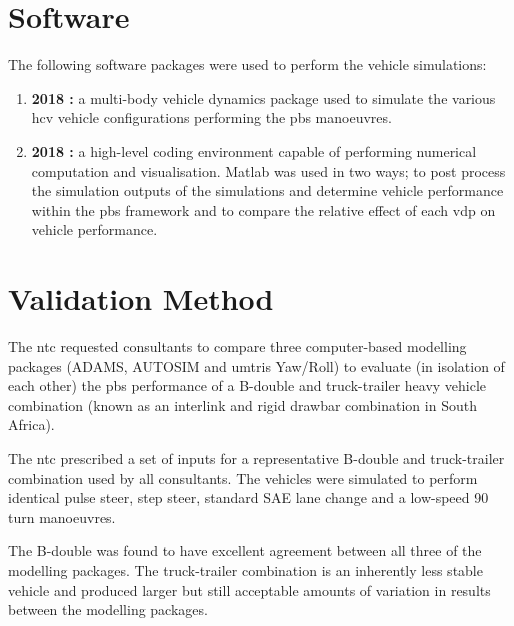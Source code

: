 \section{Software}\label{section:software}

The following software packages were used to perform the vehicle simulations:

\begin{enumerate}
	\item \textbf{\trucksim{} 2018 \cite{MechanicalSimulation2016}:} a multi-body vehicle dynamics package used to simulate the various \gls{hcv} vehicle configurations performing the \gls{pbs} manoeuvres.
	\item \textbf{\matlab{} 2018 \cite{MATHWORKS2015}:} a high-level coding environment capable of performing numerical computation and visualisation. Matlab was used in two ways; to post process the simulation outputs of the \trucksim{} simulations and determine vehicle performance within the \gls{pbs} framework and to compare the relative effect of each \gls{vdp} on vehicle performance.
\end{enumerate}

\section{Validation Method}\label{section:validation-method}

The \gls{ntc} requested consultants to compare three computer-based modelling packages (ADAMS, AUTOSIM and \glspl{umtri} Yaw/Roll) to evaluate (in isolation of each other) the \gls{pbs} performance of a B-double and truck-trailer heavy vehicle combination \cite{Prem2001} (known as an interlink and rigid drawbar combination in South Africa).

The \gls{ntc} prescribed a set of inputs for a representative B-double and truck-trailer combination used by all consultants. The vehicles were simulated to perform identical pulse steer, step steer, standard SAE lane change and a low-speed 90\degree{} turn manoeuvres.

The B-double was found to have excellent agreement between all three of the modelling packages. The truck-trailer combination is an inherently less stable vehicle and produced larger but still acceptable amounts of variation in results between the modelling packages.

